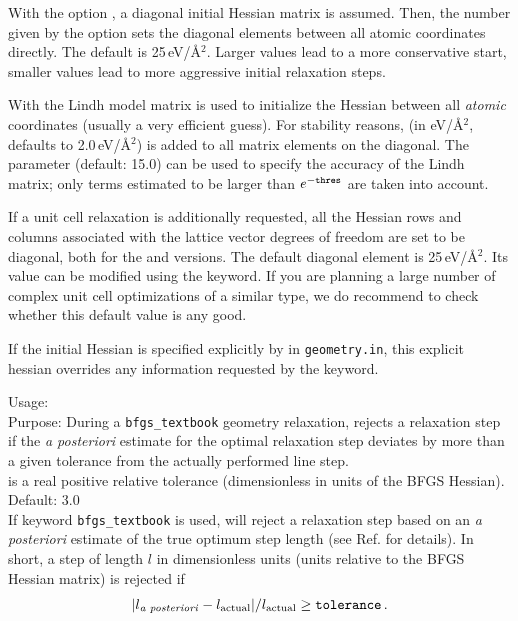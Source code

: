 With the option , a diagonal initial Hessian matrix is
assumed. Then, the number given by the  option sets the
diagonal elements between all atomic coordinates directly. The default
is 25\,eV/\AA$^2$. Larger values lead to a more conservative
start, smaller values lead to more aggressive initial relaxation steps.

With  the Lindh model matrix \cite{Lin95} is used to
initialize the Hessian between all \emph{atomic} coordinates (usually
a very efficient guess). For  stability reasons, 
(in eV/\AA$^2$, defaults to 2.0\,eV/\AA$^2$) is added to all matrix 
elements on the diagonal. The parameter  (default: 
15.0) can be used to specify the accuracy of the Lindh matrix; only
terms estimated to be larger than $e^{-\text{\texttt{thres}}}$ are
taken into account.   

If a unit cell relaxation is additionally requested, all the Hessian
rows and columns associated with the lattice vector degrees of freedom
are set to be diagonal, both for the  and 
versions. The default diagonal element is 25\,eV/\AA$^2$. Its value
can be modified using the  keyword. If
you are planning a large number of complex unit cell optimizations of
a similar type, we do recommend to check whether this default value is
any good. 

If the initial Hessian is specified explicitly by
 in \texttt{geometry.in}, this explicit
hessian overrides any information requested by the
 keyword.


{
  \noindent
  Usage:   \\[1.0ex]
  Purpose: During a  \texttt{bfgs\_textbook} geometry
    relaxation, rejects a
    relaxation step if the \emph{a posteriori} estimate for the optimal
    relaxation step deviates by more than a given tolerance from the
    actually performed line step. \\[1.0ex]
   is a real positive relative tolerance
    (dimensionless in units of the BFGS Hessian). Default:
    3.0 \\ 
}
If keyword  \texttt{bfgs\_textbook} is used,
 will reject a relaxation step based on an
\emph{a posteriori} estimate of the true optimum step length (see 
Ref. \cite{Blum08} for details). In short, a step of length $l$ in
dimensionless units (units relative to the BFGS Hessian matrix) is
rejected if 
\begin{equation}
  |l_\text{\emph{a posteriori}} - l_\text{actual}|/l_\text{actual} \ge
   \mathtt{tolerance} \, .
\end{equation}

